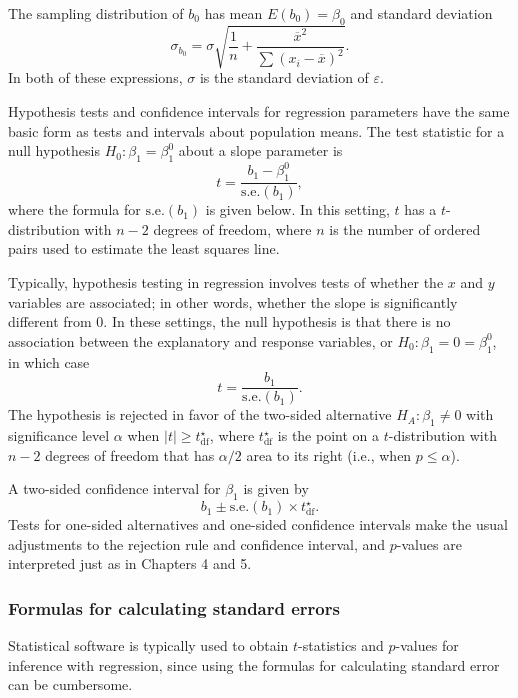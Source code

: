 The sampling distribution of $b_0$ has mean $E(b_0) = \beta_0$ and standard deviation 
\[\sigma_{b_0} = \sigma \sqrt{\frac{1}{n} + \frac{\overline{x}^2}{\sum(x_i - \overline{x})^2}}.\]
In both of these expressions, $\sigma$ is the standard deviation of $\varepsilon$.

Hypothesis tests and confidence intervals for regression parameters have the same basic form as tests and intervals about population means. The test statistic for a null hypothesis $H_0: \beta_1 = \beta^0_1$ about a slope parameter is
\[t = \frac{b_1 - \beta^0_1}{\text{s.e.}(b_1)},\]
where the formula for $\text{s.e.}(b_1)$ is given below.
In this setting, $t$ has a $t$-distribution with $n - 2$ degrees of freedom, where $n$ is the number of ordered pairs used to estimate the least squares line.  

\textD{\newpage}

Typically, hypothesis testing in regression involves tests of whether the $x$ and $y$ variables are associated; in other words, whether the slope is significantly different from 0. In these settings, the null hypothesis is that there is no association between the explanatory and response variables, or $H_0: \beta_1 = 0 = \beta^0_1$, in which case
\[t = \frac{b_1}{\text{s.e.}(b_1)}.\]
The hypothesis is rejected in favor of the two-sided alternative $H_A: \beta_1 \neq 0$ with significance level $\alpha$ when $|t| \ge t^\star_{\text{df}}$, where $t^\star_{\text{df}}$ is the point on a $t$-distribution with $n-2$ degrees of freedom that has $\alpha/2$ area to its right (i.e., when $p \leq \alpha$).


A two-sided confidence interval for $\beta_1$ is given by 
\[b_1 \pm \text{s.e.}(b_1) \times t^\star_{\text{df}}.\]
Tests for one-sided alternatives and one-sided confidence intervals make the usual adjustments to the rejection rule and confidence interval, and $p$-values are interpreted just as in Chapters 4 and 5.

\subsubsection{Formulas for calculating standard errors}


Statistical software is typically used to obtain $t$-statistics and $p$-values for inference with regression, since using the formulas for calculating standard error can be cumbersome.

